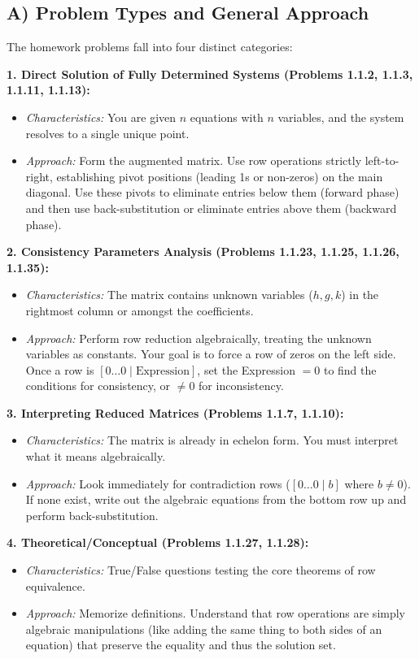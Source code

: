 \documentclass[11pt]{article}
\begin{document}
\subsection{A) Problem Types and General Approach}
The homework problems fall into four distinct categories:

\textbf{1. Direct Solution of Fully Determined Systems (Problems 1.1.2, 1.1.3, 1.1.11, 1.1.13):}
\begin{itemize}
    \item \textit{Characteristics:} You are given $n$ equations with $n$ variables, and the system resolves to a single unique point.
    \item \textit{Approach:} Form the augmented matrix. Use row operations strictly left-to-right, establishing pivot positions (leading 1s or non-zeros) on the main diagonal. Use these pivots to eliminate entries below them (forward phase) and then use back-substitution or eliminate entries above them (backward phase).
\end{itemize}

\textbf{2. Consistency Parameters Analysis (Problems 1.1.23, 1.1.25, 1.1.26, 1.1.35):}
\begin{itemize}
    \item \textit{Characteristics:} The matrix contains unknown variables ($h, g, k$) in the rightmost column or amongst the coefficients.
    \item \textit{Approach:} Perform row reduction algebraically, treating the unknown variables as constants. Your goal is to force a row of zeros on the left side. Once a row is $[0 \dots 0 \mid \text{Expression}]$, set the Expression $= 0$ to find the conditions for consistency, or $\neq 0$ for inconsistency.
\end{itemize}

\textbf{3. Interpreting Reduced Matrices (Problems 1.1.7, 1.1.10):}
\begin{itemize}
    \item \textit{Characteristics:} The matrix is already in echelon form. You must interpret what it means algebraically.
    \item \textit{Approach:} Look immediately for contradiction rows ($[0 \dots 0 \mid b]$ where $b \neq 0$). If none exist, write out the algebraic equations from the bottom row up and perform back-substitution.
\end{itemize}

\textbf{4. Theoretical/Conceptual (Problems 1.1.27, 1.1.28):}
\begin{itemize}
    \item \textit{Characteristics:} True/False questions testing the core theorems of row equivalence.
    \item \textit{Approach:} Memorize definitions. Understand that row operations are simply algebraic manipulations (like adding the same thing to both sides of an equation) that preserve the equality and thus the solution set.
\end{itemize}
\end{document}
